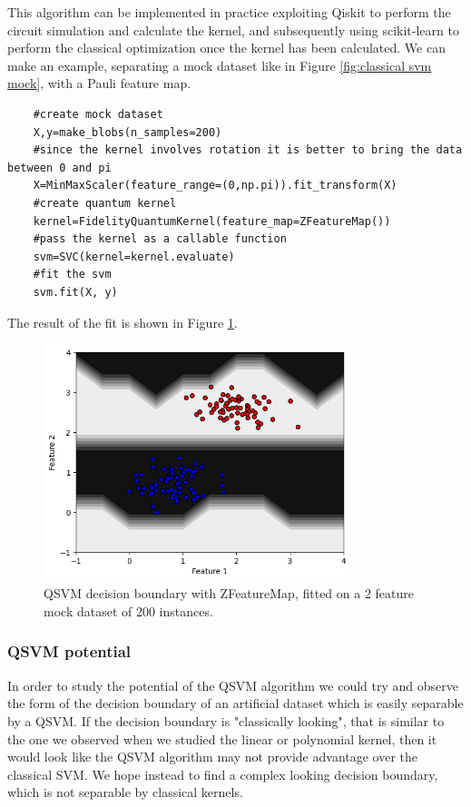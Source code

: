 \documentclass[12pt]{article}
\begin{document}
This algorithm can be implemented in practice exploiting Qiskit to perform the circuit simulation and calculate the kernel, and subsequently using scikit-learn to perform the classical optimization once the kernel has been calculated. We can make an example, separating a mock dataset like in Figure \ref{fig:classical svm mock}, with a Pauli feature map. 

\begin{lstlisting}
    #create mock dataset
    X,y=make_blobs(n_samples=200) 
    #since the kernel involves rotation it is better to bring the data between 0 and pi
    X=MinMaxScaler(feature_range=(0,np.pi)).fit_transform(X) 
    #create quantum kernel
    kernel=FidelityQuantumKernel(feature_map=ZFeatureMap()) 
    #pass the kernel as a callable function 
    svm=SVC(kernel=kernel.evaluate) 
    #fit the svm
    svm.fit(X, y) 
\end{lstlisting}

The result of the fit is shown in Figure \ref{fig:qsvm}.
\begin{figure}[h!]
    \centering
    \includegraphics[width=0.8\textwidth]{images/qsvm.png}
    \caption{QSVM decision boundary with ZFeatureMap, fitted on a 2 feature mock dataset of 200 instances.}
    \label{fig:qsvm}
\end{figure}

\subsubsection{QSVM potential}
In order to study the potential of the QSVM algorithm we could try and observe the form of the decision boundary of an artificial dataset which is easily separable by a QSVM. If the decision boundary is "classically looking", that is similar to the one we observed when we studied the linear or polynomial kernel, then it would look like the QSVM algorithm may not provide advantage over the classical SVM. We hope instead to find a complex looking decision boundary, which is not separable by classical kernels. 
\end{document}
